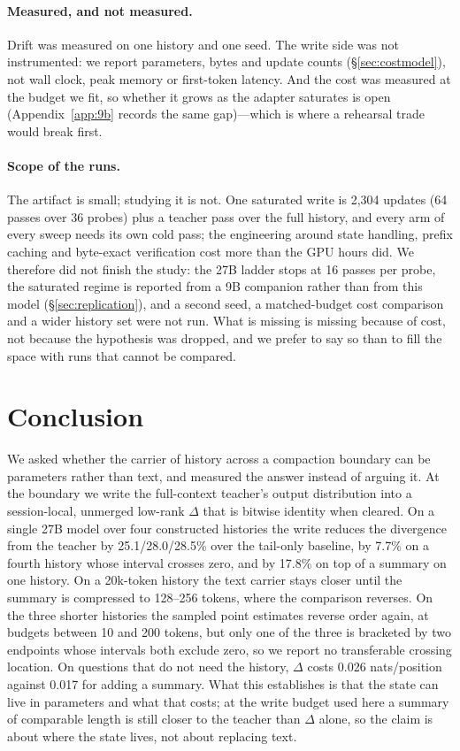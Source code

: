 \documentclass[sigconf,nonacm]{acmart}
\begin{document}
\paragraph{Measured, and not measured.} Drift was measured on one history and one seed. The write side was not
instrumented: we report parameters, bytes and update counts (\S\ref{sec:costmodel}), not wall clock, peak memory
or first-token latency. And the cost was measured at the budget we fit, so whether it grows as the adapter
saturates is open (Appendix~\ref{app:9b} records the same gap)---which is where a rehearsal trade would break
first.
\paragraph{Scope of the runs.} The artifact is small; studying it is not. One saturated write is
2{,}304 updates (64 passes over 36 probes) plus a teacher pass over the full history, and every arm of every sweep
needs its own cold pass; the engineering around state handling, prefix caching and byte-exact verification cost
more than the GPU hours did. We therefore did not finish the study: the 27B ladder stops at 16 passes per probe,
the saturated regime is reported from a 9B companion rather than from this model
(\S\ref{sec:replication}), and a second seed, a matched-budget cost comparison and a wider history set were not
run. What is missing is missing because of cost, not because the hypothesis was dropped, and we prefer to say so
than to fill the space with runs that cannot be compared.

\section{Conclusion}

We asked whether the carrier of history across a compaction boundary can be parameters rather
than text, and measured the answer instead of arguing it. At the boundary we write the full-context teacher's
output distribution into a session-local, unmerged low-rank $\Delta$ that is bitwise identity when cleared. On a
single 27B model over four constructed histories the write reduces the divergence from the teacher by
25.1/28.0/28.5\% over the tail-only baseline, by 7.7\% on a fourth history whose interval crosses zero, and by
17.8\% on top of a summary on one history. On a 20k-token history the text carrier stays closer until the
summary is compressed to 128--256 tokens, where the comparison reverses. On the three shorter histories the sampled
point estimates reverse order again, at budgets between 10 and 200 tokens, but only one of the three is bracketed by
two endpoints whose intervals both exclude zero, so we report no transferable crossing location. On questions
that do not need the
history, $\Delta$ costs 0.026 nats/position against 0.017 for adding a summary. What this establishes is that
the state can live in parameters and what that costs; at the write budget used here a summary of comparable
length is still closer to the teacher than $\Delta$ alone, so the claim is about where the state lives, not
about replacing text.
\end{document}
